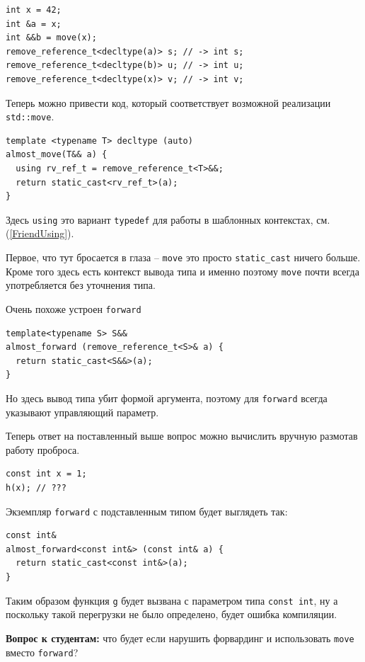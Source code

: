 \documentclass[a4paper,12pt,oneside]{book}
\begin{document}
\begin{lstlisting}
int x = 42;
int &a = x;
int &&b = move(x);
remove_reference_t<decltype(a)> s; // -> int s;
remove_reference_t<decltype(b)> u; // -> int u;
remove_reference_t<decltype(x)> v; // -> int v;
\end{lstlisting}

Теперь можно привести код, который соответствует возможной реализации \lstinline!std::move!.

\begin{lstlisting}
template <typename T> decltype (auto)
almost_move(T&& a) {
  using rv_ref_t = remove_reference_t<T>&&;
  return static_cast<rv_ref_t>(a);
} 
\end{lstlisting}

Здесь \lstinline!using! это вариант \lstinline!typedef! для работы в шаблонных контекстах, см. (\ref{FriendUsing}).

Первое, что тут бросается в глаза -- \lstinline!move! это просто \lstinline!static_cast! ничего больше. Кроме того здесь есть контекст вывода типа и именно поэтому \lstinline!move! почти всегда употребляется без уточнения типа.

Очень похоже устроен \lstinline!forward!

\begin{lstlisting}
template<typename S> S&&
almost_forward (remove_reference_t<S>& a) {
  return static_cast<S&&>(a);
}
\end{lstlisting}

Но здесь вывод типа убит формой аргумента, поэтому для \lstinline!forward! всегда указывают управляющий параметр.

Теперь ответ на поставленный выше вопрос можно вычислить вручную размотав работу проброса.

\begin{lstlisting}
const int x = 1;
h(x); // ???
\end{lstlisting}

Экземпляр \lstinline!forward! с подставленным типом будет выглядеть так:

\begin{lstlisting}
const int&
almost_forward<const int&> (const int& a) {
  return static_cast<const int&>(a);
}
\end{lstlisting}

Таким образом функция \lstinline!g! будет вызвана с параметром типа \lstinline!const int!, ну а поскольку такой перегрузки не было определено, будет ошибка компиляции.

\textbf{Вопрос к студентам:} что будет если нарушить форвардинг и использовать \lstinline!move! вместо \lstinline!forward!?
\end{document}

